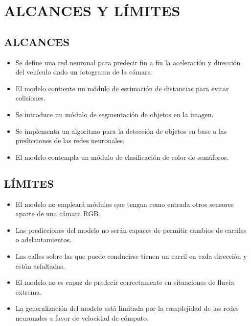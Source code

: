 \section{ALCANCES Y LÍMITES}
	\subsection{ALCANCES}
		\begin{itemize}[nosep]
			\item Se define una red neuronal para predecir fin a fin la aceleración y dirección del vehículo dado un fotograma de la cámara.
			\item El modelo contiente un módulo de estimación de distancias para evitar colisiones.
			\item Se introduce un módulo de segmentación de objetos en la imagen.
			\item Se implementa un algoritmo para la detección de objetos en base a las predicciones de las redes neuronales.
			\item El modelo contempla un módulo de clasificación de color de semáforos.
		\end{itemize}
	\subsection{LÍMITES}
		\begin{itemize}[nosep]
			\item El modelo no empleará módulos que tengan como entrada otros sensores aparte de una cámara RGB.
			\item Las predicciones del modelo no serán capaces de permitir cambios de carriles o adelantamientos.
			\item Las calles sobre las que puede conducirse tienen un carril en cada dirección y están asfaltadas.
			\item El modelo no es capaz de predecir correctamente en situaciones de lluvia extrema.
			\item La generalización del modelo está limitada por la complejidad de las redes neuronales a favor de velocidad de cómputo.
		\end{itemize}

